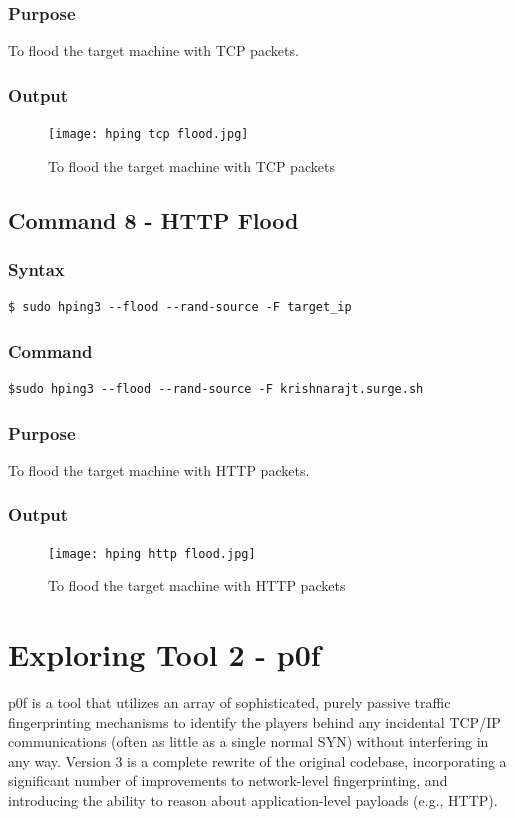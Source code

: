 \documentclass[11pt]{article}
\begin{document}
\subsubsection*{Purpose}
To flood the target machine with TCP packets.

\subsubsection*{Output}
\begin{figure}[H]
    \centering
    \texttt{[image: hping tcp flood.jpg]}
    \caption{To flood the target machine with TCP packets}
    \label{fig:7}
\end{figure}

\subsection{Command 8 - HTTP Flood}

\subsubsection*{Syntax}
\begin{verbatim}
$ sudo hping3 --flood --rand-source -F target_ip
\end{verbatim}

\subsubsection*{Command}
\begin{verbatim}
$sudo hping3 --flood --rand-source -F krishnarajt.surge.sh
\end{verbatim}

\subsubsection*{Purpose}
To flood the target machine with HTTP packets.

\subsubsection*{Output}
\begin{figure}[H]
    \centering
    \texttt{[image: hping http flood.jpg]}
    \caption{To flood the target machine with HTTP packets}
    \label{fig:8}
\end{figure}

\section{Exploring Tool 2 - p0f}
p0f is a tool that utilizes an array of sophisticated, purely passive traffic fingerprinting mechanisms to identify the players behind any incidental TCP/IP communications (often as little as a single normal SYN) without interfering in any way. Version 3 is a complete rewrite of the original codebase, incorporating a significant number of improvements to network-level fingerprinting, and introducing the ability to reason about application-level payloads (e.g., HTTP).
\end{document}
